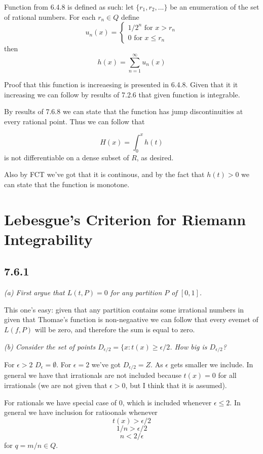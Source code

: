 \documentclass[11pt,oneside,titlepage]{book}
\begin{document}
Function from 6.4.8 is defined as such: let $\{ r_1, r_2, ... \}$ be an
enumeration of the set of rational numbers. For each $r_n \in Q$ define
$$u_n(x) =
\begin{cases}
  1/2^n \text{ for } x > r_n \\
  0 \text{ for } x \leq r_n
\end{cases}
$$
then
$$h(x) = \sum_{n = 1}^{\infty}{u_n(x)}$$

Proof that this function is increaesing is presented in 6.4.8. Given that it
it increasing we can follow by results of 7.2.6 that given function is
integrable.

By results of 7.6.8 we can state that the function has jump discontinuities
at every rational point. Thus we can follow that

$$H(x) = \int_0^x{h(t)}$$
is not differentiable on a dense subset of $R$, as desired.

Also by FCT we've got that it is continous, and by the fact that $h(t) > 0$
we can state that the function is monotone.

\section{Lebesgue's Criterion for Riemann Integrability}

\subsection*{7.6.1}

\textit{(a) First argue that $L(t, P) = 0$ for any partition $P$ of $[0, 1]$.}

This one's easy: given that any partition contains some irrational numbers
in given that Thomae's function is non-negaative we can follow that
every evemet of $L(f, P)$ will be zero, and therefore the sum is equal to zero.

\textit{(b) Consider the set of points
  $D_{\epsilon/2} = \{x: t(x) \geq \epsilon/2$. How big is $D_{\epsilon/2}$?}

For $\epsilon > 2$ $D_{\epsilon} = \emptyset$.
For $\epsilon = 2$ we've got $D_{\epsilon/2} = Z$. As $\epsilon$ gets smaller
we include. In general we have that irrationals are not included because
$t(x) = 0$ for all irrationals (we are not given that $\epsilon > 0$, but I
think that it is assumed).

For rationals we have special case of $0$, which is included whenever
$\epsilon \leq 2$. In general we have inclusion for ratioonals whenever 
$$t(x) > \epsilon/2$$
$$1/n  > \epsilon/2$$
$$n < 2/\epsilon$$
for $q = m/n \in Q$.
\end{document}
